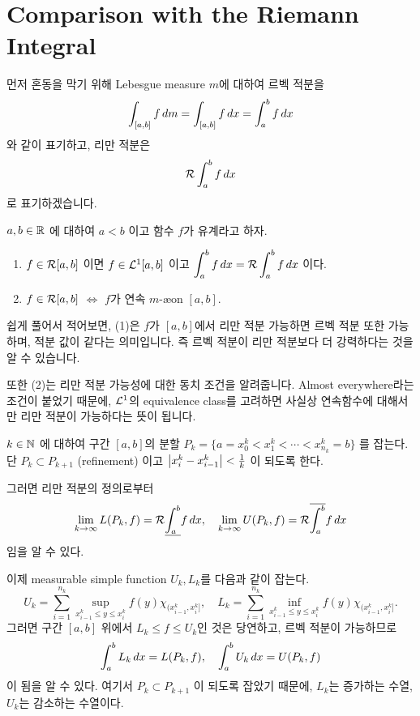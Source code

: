 \section*{Comparison with the Riemann Integral}

먼저 혼동을 막기 위해 Lebesgue measure \(m\)에 대하여 르벡 적분을
\[
    \int_{[a, b]} f \,d{m} = \int_{[a, b]} f \,d{x} = \int_a^b f \,d{x}
\]
와 같이 표기하고, 리만 적분은
\[
    \mathcal{R}\int_a^b f\,d{x}
\]
로 표기하겠습니다.

 \(a, b \in \mathbb{R}\) 에 대하여 \(a < b\) 이고 함수 \(f\)가 유계라고 하자.
\begin{enumerate}
    \item \(f \in \mathcal{R}[a, b]\) 이면 \(f \in \mathcal{L}^{1}[a, b]\) 이고 \(\displaystyle \int_a^b f\,d{x} = \mathcal{R}\int_a^b f \,d{x}\) 이다.
    \item \(f \in \mathcal{R}[a, b]\) \(\iff\) \(f\)가 연속 \(m\)-\ae on \([a, b]\).
\end{enumerate}

쉽게 풀어서 적어보면, (1)은 \(f\)가 \([a, b]\)에서 리만 적분 가능하면 르벡 적분 또한 가능하며, 적분 값이 같다는 의미입니다. 즉 르벡 적분이 리만 적분보다 더 강력하다는 것을 알 수 있습니다.

또한 (2)는 리만 적분 가능성에 대한 동치 조건을 알려줍니다. Almost everywhere라는 조건이 붙었기 때문에, \(\mathcal{L}^1\)의 equivalence class를 고려하면 사실상 연속함수에 대해서만 리만 적분이 가능하다는 뜻이 됩니다.

\pf \(k \in \mathbb{N}\) 에 대하여 구간 \([a, b]\)의 분할 \(P_k = \{a = x_0^k < x_1^k < \cdots < x_{n_k}^k = b\}\) 를 잡는다. 단 \(P_k \subset P_{k+1}\) (refinement) 이고 \(\left| x_{i}^k - x_{i-1}^k \right| < \frac{1}{k}\) 이 되도록 한다.

그러면 리만 적분의 정의로부터
\[
    \lim_{k \rightarrow \infty} L(P_k, f) = \mathcal{R}\underline{\int_{a}^{b}} f\,d{x}, \quad \lim_{k \rightarrow \infty} U(P_k, f) = \mathcal{R} \overline{\int_{a}^{b}} f \,d{x}
\]
임을 알 수 있다.

이제 measurable simple function \(U_k, L_k\)를 다음과 같이 잡는다.
\[
    U_k = \sum_{i=1}^{n_k} \sup_{x_{i-1}^k \leq y \leq x_{i}^k} f(y) \chi_{(x_{i-1}^k, x_i^k]}, \quad L_k = \sum_{i=1}^{n_k} \inf_{x_{i-1}^k \leq y \leq x_{i}^k} f(y) \chi_{(x_{i-1}^k, x_i^k]}.
\]
그러면 구간 \([a, b]\) 위에서 \(L_k \leq f \leq U_k\)인 것은 당연하고, 르벡 적분이 가능하므로
\[
    \int_a^b L_k \,d{x} = L(P_k, f), \quad \int_a^b U_k \,d{x} = U(P_k, f)
\]
이 됨을 알 수 있다. 여기서 \(P_k \subset P_{k + 1}\) 이 되도록 잡았기 때문에, \(L_k\)는 증가하는 수열, \(U_k\)는 감소하는 수열이다.

